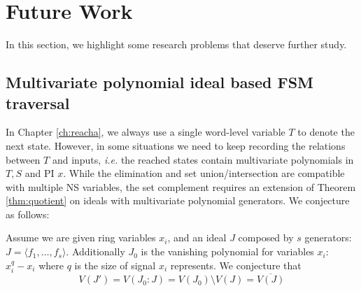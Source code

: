 \section{Future Work}
In this section, we highlight some research problems that deserve further study.
\subsection{Multivariate polynomial ideal based FSM traversal}
In Chapter \ref{ch:reacha}, we always use a single word-level variable $T$ to denote the
next state. However, in some situations we need to keep recording the relations between $T$ and
inputs, {\it i.e.} the reached states contain multivariate polynomials in $T,S$ and PI $x$. 
While the elimination and set union/intersection are compatible with multiple NS variables,
the set complement requires an extension of Theorem \ref{thm:quotient} on ideals with 
multivariate polynomial generators. We conjecture as follows:

\begin{Conjecture}
Assume we are given ring variables $x_i$, and an ideal $J$ composed by $s$ generators:
$J = \langle f_1,\dots, f_s\rangle$.  Additionally $J_0$ is the vanishing polynomial for variables
$x_i$: $ x_i^{q} - x_i$ where $q$ is the size of signal $x_i$ represents.
We conjecture that
$$V(J') = V(J_0:J) = V(J_0)\setminus V(J) = \overline{V(J)}$$
\end{Conjecture}

